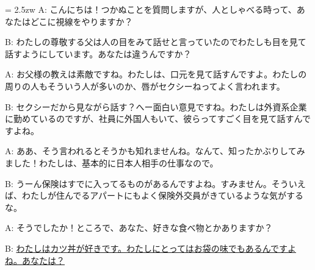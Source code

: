 \documentclass[11pt]{amsart}
\title{}
\author{}
\newenvironment{hangall}[1]{\hangindent = 2.5zw\everypar{\hangindent = 2.5zw}}{}
\begin{document}
\maketitle
\begin{hangall}{}%
A: こんにちは！つかぬことを質問しますが、人としゃべる時って、あなたはどこに視線をやりますか？

B: わたしの尊敬する父は人の目をみて話せと言っていたのでわたしも目を見て話すようにしています。あなたは違うんですか？

A: お父様の教えは素敵ですね。わたしは、口元を見て話すんですよ。わたしの周りの人もそういう人が多いのか、唇がセクシーねってよく言われます。

B: セクシーだから見ながら話す？へー面白い意見ですね。わたしは外資系企業に勤めているのですが、社員に外国人もいて、彼らってすごく目を見て話すんですよね。

A: ああ、そう言われるとそうかも知れませんね。なんて、知ったかぶりしてみました！わたしは、基本的に日本人相手の仕事なので。

B: うーん保険はすでに入ってるものがあるんですよね。すみません。そういえば、わたしが住んでるアパートにもよく保険外交員がきているような気がするな。

A: そうでしたか！ところで、あなた、好きな食べ物とかありますか？

B: \ul{わたしはカツ丼が好きです。わたしにとってはお袋の味でもあるんですよね。あなたは？}\end{hangall}
\end{document}
